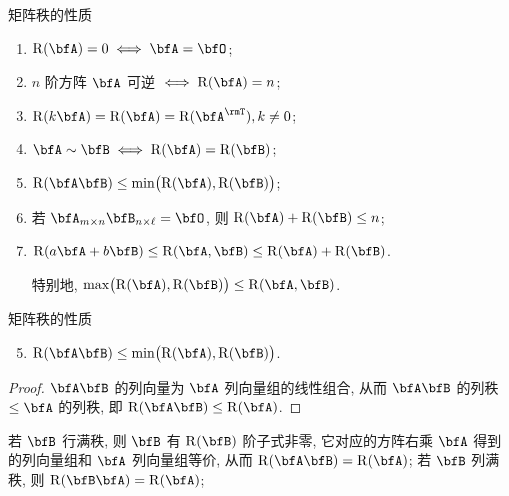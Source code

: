 \begin{frame}{矩阵秩的性质}
	\onslide<+->
	\begin{proposition}
		\begin{enumerate}
			\item $\rank(\bfA)=0\iff \bfA=\bfO$;
			\item $n$ 阶方阵 $\bfA$ 可逆 $\iff \rank(\bfA)=n$;
			\item $\rank(k\bfA)=\rank(\bfA)=\rank(\bfA^\rmT), k\neq 0$;
			\item $\bfA\sim\bfB\iff \rank(\bfA)=\rank(\bfB)$;
			\item $\rank(\bfA\bfB)\le \min\bigl(\rank(\bfA),\rank(\bfB)\bigr)$;
			\item 若 $\bfA_{m\times n}\bfB_{n\times\ell}=\bfO$, 则 $\rank(\bfA)+\rank(\bfB)\le n$;
			\item $\rank(a\bfA+b\bfB)\le \rank(\bfA,\bfB)\le \rank(\bfA)+\rank(\bfB)$.
			
			特别地, $\max\bigl(\rank(\bfA),\rank(\bfB)\bigr)\le \rank(\bfA,\bfB)$.
		\end{enumerate}
	\end{proposition}
\end{frame}


\begin{frame}{矩阵秩的性质}
	\onslide<+->
	\begin{proposition}
		\begin{enumerate}
			\setcounter{enumi}{4}
			\item $\rank(\bfA\bfB)\le \min\bigl(\rank(\bfA),\rank(\bfB)\bigr)$.
		\end{enumerate}
	\end{proposition}
	\onslide<+->
	\begin{proof}
		$\bfA\bfB$ 的列向量为 $\bfA$ 列向量组的线性组合, 从而 $\bfA\bfB$ 的列秩 $\le \bfA$ 的列秩, 即 $\rank(\bfA\bfB)\le \rank(\bfA)$.
		\onslide<+->{%
			于是
			\[\rank(\bfA\bfB)=\rank(\bfB^\rmT\bfA^\rmT)\le \rank(\bfB^\rmT)=\rank(\bfB).\qedhere\]
		}
		\vspace{-\baselineskip}
	\end{proof}
	\onslide<+->
	若 $\bfB$ 行满秩, 则 $\bfB$ 有 $\rank(\bfB)$ 阶子式非零, 它对应的方阵右乘 $\bfA$ 得到的列向量组和 $\bfA$ 列向量组等价, 从而 $\rank(\bfA\bfB)=\rank(\bfA)$;
	\onslide<+->
	若 $\bfB$ 列满秩, 则 $\rank(\bfB\bfA)=\rank(\bfA)$;
\end{frame}


